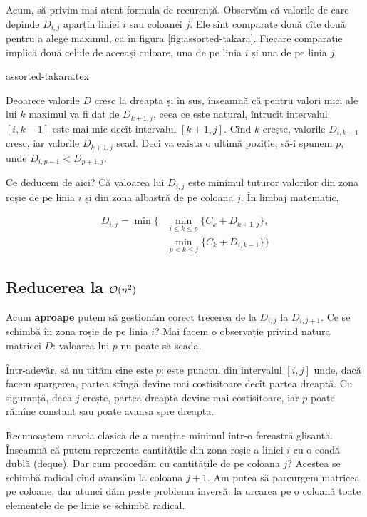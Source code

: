 \documentclass[../main.tex]{subfiles}
\begin{document}
Acum, să privim mai atent formula de recurență. Observăm că valorile de care depinde $D_{i,j}$ aparțin liniei $i$ sau coloanei $j$. Ele sînt comparate două cîte două pentru a alege maximul, ca în figura \ref{fig:assorted-takara}. Fiecare comparație implică două celule de aceeași culoare, una de pe linia $i$ și una de pe linia $j$.

{assorted-takara.tex}

Deoarece valorile $D$ cresc la dreapta și în sus, înseamnă că pentru valori mici ale lui $k$ maximul va fi dat de $D_{k+1, j}$, ceea ce este natural, întrucît intervalul $[i, k - 1]$ este mai mic decît intervalul $[k + 1, j]$. Cînd $k$ crește, valorile $D_{i,k-1}$ cresc, iar valorile $D_{k+1,j}$ scad. Deci va exista o ultimă poziție, să-i spunem $p$, unde $D_{i,p-1} < D_{p+1,j}$.

Ce deducem de aici? Că valoarea lui $D_{i, j}$ este minimul tuturor valorilor din zona roșie de pe linia $i$ și din zona albastră de pe coloana $j$. În limbaj matematic,

\begin{align*}
  D_{i,j} = \min \big\{ & \min_{i \leq k \leq p} \{ C_k + D_{k+1, j} \},\\
  & \min_{p < k \leq j} \{ C_k + D_{i, k-1} \} \big\}
\end{align*}

\subsection{Reducerea la \texorpdfstring{$\mathcal{O}(n^2)$}{O(n2)}}

Acum \textbf{aproape} putem să gestionăm corect trecerea de la $D_{i,j}$ la $D_{i,j+1}$. Ce se schimbă în zona roșie de pe linia $i$? Mai facem o observație privind natura matricei $D$: valoarea lui $p$ nu poate să scadă.

Într-adevăr, să nu uităm cine este $p$: este punctul din intervalul $[i, j]$ unde, dacă facem spargerea, partea stîngă devine mai costisitoare decît partea dreaptă. Cu siguranță, dacă $j$ crește, partea dreaptă devine mai costisitoare, iar $p$ poate rămîne constant sau poate avansa spre dreapta.

Recunoaștem nevoia clasică de a menține minimul într-o fereastră glisantă. Înseamnă că putem reprezenta cantitățile din zona roșie a liniei $i$ cu o coadă dublă (deque). Dar cum procedăm cu cantitățile de pe coloana $j$? Acestea se schimbă radical cînd avansăm la coloana $j + 1$. Am putea să parcurgem matricea pe coloane, dar atunci dăm peste problema inversă: la urcarea pe o coloană toate elementele de pe linie se schimbă radical.
\end{document}
